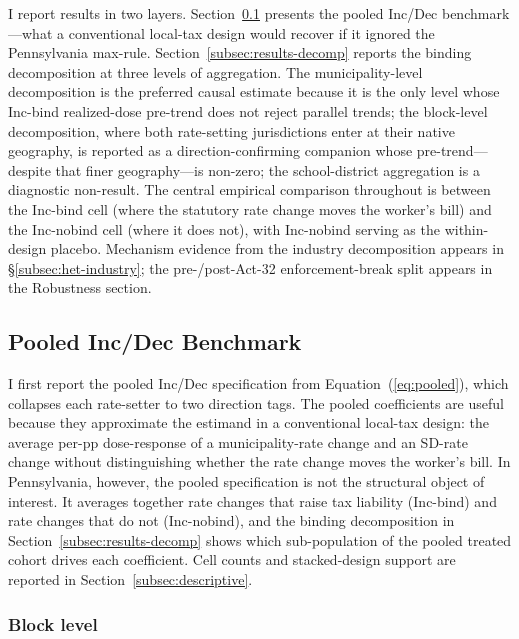\documentclass[12pt]{article}
\begin{document}
I report results in two layers. Section~\ref{subsec:results-pooled}
presents the pooled Inc/Dec benchmark---what a conventional local-tax
design would recover if it ignored the Pennsylvania max-rule.
Section~\ref{subsec:results-decomp} reports the binding
decomposition at three levels of aggregation. The municipality-level
decomposition is the preferred causal estimate because it is the only
level whose Inc-bind realized-dose pre-trend does not reject parallel
trends; the block-level decomposition, where both rate-setting
jurisdictions enter at their native geography, is reported as a
direction-confirming companion whose pre-trend---despite that finer
geography---is non-zero; the school-district aggregation is a
diagnostic non-result. The central empirical comparison throughout
is between the Inc-bind cell (where the statutory rate change moves
the worker's bill) and the Inc-nobind cell (where it does not), with
Inc-nobind serving as the within-design placebo. Mechanism evidence
from the industry decomposition appears in
\S\ref{subsec:het-industry}; the pre-/post-Act-32 enforcement-break
split appears in the Robustness section.

\subsection{Pooled Inc/Dec Benchmark}
\label{subsec:results-pooled}

I first report the pooled Inc/Dec specification from
Equation~(\ref{eq:pooled}), which collapses each rate-setter to
two direction tags. The pooled coefficients are useful because they
approximate the estimand in a conventional local-tax design: the
average per-pp dose-response of a municipality-rate change and an SD-rate
change without distinguishing whether the rate change moves the
worker's bill. In Pennsylvania, however, the pooled specification is
not the structural object of interest. It averages together rate
changes that raise tax liability (Inc-bind) and rate changes that do
not (Inc-nobind), and the binding decomposition in
Section~\ref{subsec:results-decomp}
shows which sub-population of the pooled treated cohort drives each
coefficient. Cell counts and stacked-design support are reported in
Section~\ref{subsec:descriptive}.

\subsubsection{Block level}
\label{subsubsec:pooled-block}
\end{document}

